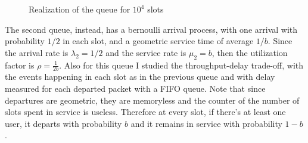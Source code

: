 \documentclass[10pt]{article}
\begin{document}
\begin{figure}[h!]
\centering
  \caption{Realization of the queue for $10^4$ slots}
  \label{fig:queue_a_real}
\end{figure}


The second queue, instead, has a bernoulli arrival process, with one arrival with probability $1/2$ in each slot, and a geometric service time of average $1/b$. Since the arrival rate is $\lambda_2 = 1/2$ and the service rate is $\mu_2 = b$, then the utilization factor is $\rho = \frac{1}{2b}$. Also for this queue I studied the throughput-delay trade-off, with the events happening in each slot as in the previous queue and with delay measured for each departed packet with a FIFO queue. Note that since departures are geometric, they are memoryless and the counter of the number of slots spent in service is useless. Therefore at every slot, if there's at least one user, it departs with probability $b$ and it remains in service with probability $1-b$. 
\end{document}
